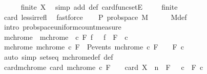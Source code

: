 \begin{isabellebody}
\ \ \ \ \isamarkupfalse%
\ {\isacartoucheopen}finite\ X{\isacartoucheclose}\ \isamarkupfalse%
\ {\isacharparenleft}{\kern0pt}simp\ add{\isacharcolon}{\kern0pt}\ {\isasymOmega}{\isacharunderscore}{\kern0pt}def\ card{\isacharunderscore}{\kern0pt}funcsetE{\isacharparenright}{\kern0pt}\isanewline
\ \ \isamarkupfalse%
\ {\isasymOmega}{\isacharcolon}{\kern0pt}\ {\isachardoublequoteopen}finite\ {\isasymOmega}{\isachardoublequoteclose}\ {\isachardoublequoteopen}{\isasymOmega}\ {\isasymnoteq}\ {\isacharbraceleft}{\kern0pt}{\isacharbraceright}{\kern0pt}{\isachardoublequoteclose}\isanewline
\ \ \ \ \isamarkupfalse%
\ card{\isasymOmega}\ less{\isacharunderscore}{\kern0pt}irrefl\ \isamarkupfalse%
\ fastforce{\isacharplus}{\kern0pt}\isanewline
\ \ \isamarkupfalse%
\ P{\isacharcolon}{\kern0pt}\ prob{\isacharunderscore}{\kern0pt}space\ M\isanewline
\ \ \ \ \isamarkupfalse%
\ M{\isacharunderscore}{\kern0pt}def\ \isamarkupfalse%
\ {\isacharparenleft}{\kern0pt}intro\ prob{\isacharunderscore}{\kern0pt}space{\isacharunderscore}{\kern0pt}uniform{\isacharunderscore}{\kern0pt}count{\isacharunderscore}{\kern0pt}measure\ {\isasymOmega}{\isacharparenright}{\kern0pt}\isanewline
\ \ \isamarkupfalse%
\ mchrome\ \ {\isachardoublequoteopen}mchrome\ {\isasymequiv}\ {\isasymlambda}c\ F{\isachardot}{\kern0pt}\ {\isacharbraceleft}{\kern0pt}f\ {\isasymin}\ {\isasymOmega}{\isachardot}{\kern0pt}\ f\ {\isacharbackquote}{\kern0pt}\ F\ {\isasymsubseteq}\ {\isacharbraceleft}{\kern0pt}c{\isacharbraceright}{\kern0pt}{\isacharbraceright}{\kern0pt}{\isachardoublequoteclose}\isanewline
\ \ \ \ \ \ %
\isanewline
\ \ \isamarkupfalse%
\ mchrome{\isacharcolon}{\kern0pt}\ {\isachardoublequoteopen}mchrome\ c\ F\ {\isasymin}\ P{\isachardot}{\kern0pt}events{\isachardoublequoteclose}\ {\isachardoublequoteopen}mchrome\ c\ F\ {\isasymsubseteq}\ {\isasymOmega}{\isachardoublequoteclose}\ \ F\ c\isanewline
\ \ \ \ \isamarkupfalse%
\ {\isacharparenleft}{\kern0pt}auto\ simp{\isacharcolon}{\kern0pt}\ sets{\isacharunderscore}{\kern0pt}eq\ mchrome{\isacharunderscore}{\kern0pt}def\ {\isasymOmega}{\isacharunderscore}{\kern0pt}def{\isacharparenright}{\kern0pt}\isanewline
\ \ \isamarkupfalse%
\ card{\isacharunderscore}{\kern0pt}mchrome{\isacharcolon}{\kern0pt}\ {\isachardoublequoteopen}card\ {\isacharparenleft}{\kern0pt}mchrome\ c\ F{\isacharparenright}{\kern0pt}\ {\isacharequal}{\kern0pt}\ {}\ {\isacharcircum}{\kern0pt}\ {\isacharparenleft}{\kern0pt}card\ X\ {\isacharminus}{\kern0pt}\ n{\isacharparenright}{\kern0pt}{\isachardoublequoteclose}\ \ {\isachardoublequoteopen}F\ {\isasymin}\ {\isasymF}{\isachardoublequoteclose}\ {\isachardoublequoteopen}c{\isacharless}{\kern0pt}{}{\isachardoublequoteclose}\ \ F\ c\isanewline

\end{isabellebody}
